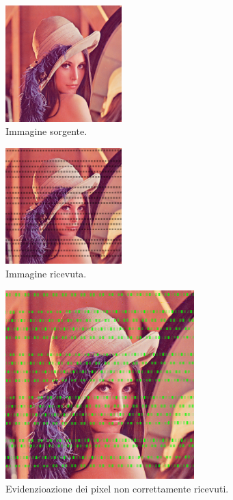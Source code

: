 \begin{figure}[ht]
\centering \includegraphics[width=0.40\textwidth]{../images/lena1.png}
	\caption{Immagine sorgente.}
	\label{fig:sorgente}
\end{figure}

\begin{figure}[ht]
\centering \includegraphics[width=0.40\textwidth]{../images/lena2.png}
	\caption{Immagine ricevuta.}
	\label{fig:ricevuta}
\end{figure}

\begin{figure}[ht]
\centering \includegraphics[width=0.65\textwidth]{../images/lena3.png}
	\caption{Evidenzioazione dei pixel non correttamente ricevuti.}
	\label{fig:evidenza}
\end{figure}

